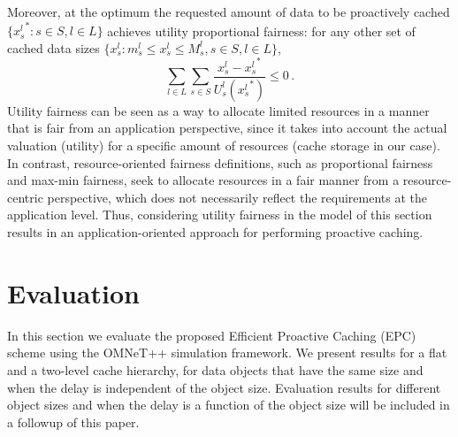 \documentclass[conference]{IEEEtran}
\newcommand{\mynotex}[1]{}
\newcommand{\M}{\mbox{\tiny M}}
\newcommand{\Leaf}{\mbox{\tiny L}}
\newcommand{\R}{\mbox{\tiny R}}
\begin{document}
Moreover, at the optimum the requested amount of data to be proactively cached $\{ {x^l_s}^*: s \in S, l \in L \}$ achieves utility proportional fairness: for any other set of cached data sizes $\{ x^l_s: m_s^l \leq x^l_s \leq M^l_s, s \in S, l \in L \}$,
$$
\sum_{l \in L} \sum_{s \in S} \frac{x^l_s - {x^l_s}^*}{U^l_s({x^l_s}^*)} \leq 0 \, .
$$
Utility fairness can be seen as a way to allocate limited resources in a manner that is fair from an application perspective, since it takes into account the actual valuation (utility) for a specific amount of resources (cache storage in our case). In contrast, resource-oriented fairness definitions, such as proportional fairness and max-min fairness, seek to allocate resources in a fair manner from a resource-centric perspective, which does not necessarily reflect the requirements at the application level. Thus, considering utility fairness in the model of this section results in an application-oriented approach for performing proactive caching.


\vspace{-0.09in}
\section{Evaluation}
\label{sec:evaluation}
\vspace{-0.03in}

\mynotex{Comparison with/influence of
\begin{itemize}
\item Optimal scheme for single-level and oracle
\item distribution of a given/fixed total cache storage to leaf and mid-level caches, for different total cache storage
\item ratio (total cache)/demand, for different values of mid-level buffer
\item influence of mobile transition probabilities
\item influence of delay costs $D_{\Leaf},D_{\M},D_{\R}$
\item probably not: mid-level cache and leaf cache size
\end{itemize}
}

In this section we evaluate the proposed Efficient Proactive Caching (EPC) scheme  using the OMNeT++ simulation framework. We present results for a flat and a two-level cache hierarchy, for data objects that have the same size and when the delay is independent of the object size. Evaluation results for different object sizes and when the delay is a function of the  object size will be included in a followup of this paper.
\end{document}
